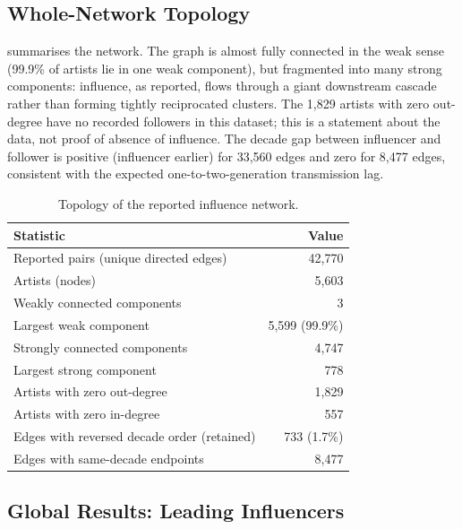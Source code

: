 \subsection{Whole-Network Topology}\label{subsec:q1-topology}

 summarises the network. The graph is almost fully
connected in the weak sense (99.9\% of artists lie in one weak component), but
fragmented into many strong components: influence, as reported, flows through a
giant downstream cascade rather than forming tightly reciprocated clusters.
The 1{,}829 artists with zero out-degree have no recorded followers in this
dataset; this is a statement about the data, not proof of absence of influence.
The decade gap between influencer and follower is positive (influencer earlier)
for 33{,}560 edges and zero for 8{,}477 edges, consistent with the expected
one-to-two-generation transmission lag.

\begin{table}[htbp]
\centering
\caption{Topology of the reported influence network.}
\label{tab:q1-topology}
\begin{tabular}{lr}
\toprule
Statistic & Value \\
\midrule
Reported pairs (unique directed edges) & 42{,}770 \\
Artists (nodes) & 5{,}603 \\
Weakly connected components & 3 \\
Largest weak component & 5{,}599 (99.9\%) \\
Strongly connected components & 4{,}747 \\
Largest strong component & 778 \\
Artists with zero out-degree & 1{,}829 \\
Artists with zero in-degree & 557 \\
Edges with reversed decade order (retained) & 733 (1.7\%) \\
Edges with same-decade endpoints & 8{,}477 \\
\bottomrule
\end{tabular}
\end{table}

\subsection{Global Results: Leading Influencers}\label{subsec:q1-global}

